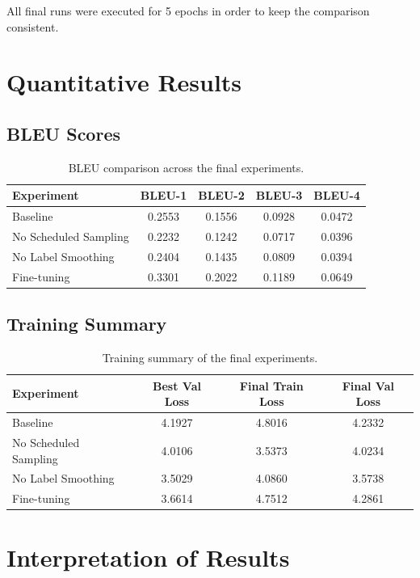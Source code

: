 \documentclass[11pt,a4paper]{article}
\begin{document}
All final runs were executed for 5 epochs in order to keep the comparison consistent.

\section{Quantitative Results}

\subsection{BLEU Scores}

\begin{table}[H]
\centering
\caption{BLEU comparison across the final experiments.}
\begin{tabular}{lcccc}
\toprule
Experiment & BLEU-1 & BLEU-2 & BLEU-3 & BLEU-4 \\
\midrule
Baseline & 0.2553 & 0.1556 & 0.0928 & 0.0472 \\
No Scheduled Sampling & 0.2232 & 0.1242 & 0.0717 & 0.0396 \\
No Label Smoothing & 0.2404 & 0.1435 & 0.0809 & 0.0394 \\
Fine-tuning & 0.3301 & 0.2022 & 0.1189 & 0.0649 \\
\bottomrule
\end{tabular}
\end{table}

\subsection{Training Summary}

\begin{table}[H]
\centering
\caption{Training summary of the final experiments.}
\begin{tabular}{lccc}
\toprule
Experiment & Best Val Loss & Final Train Loss & Final Val Loss \\
\midrule
Baseline & 4.1927 & 4.8016 & 4.2332 \\
No Scheduled Sampling & 4.0106 & 3.5373 & 4.0234 \\
No Label Smoothing & 3.5029 & 4.0860 & 3.5738 \\
Fine-tuning & 3.6614 & 4.7512 & 4.2861 \\
\bottomrule
\end{tabular}
\end{table}

\section{Interpretation of Results}
\end{document}
